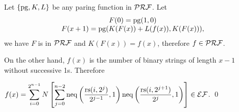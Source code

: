 \begin{pf} \rm
  Let $\{\mathrm{pg}, K, L\}$ be any paring function in $\mathcal{PRF}$. Let
\[
\begin{array}{c}
F(0) = \mathrm{pg}( 1, 0 ) \\
F(x + 1) = \mathrm{pg}(K(F(x)) + L(f(x)),  K(F(x))),
\end{array}
\]
we have $F$ is in $\mathcal{PRF}$ and $K(F(x)) = f(x)$, therefore $f\in\mathcal{PRF}$. 

On the other hand, 
$f(x)$ is the number of binary strings of length $x-1$ without successive 1s. Therefore

$\displaystyle f(x) = \sum_{i=0}^{ 2^{n-1}} N\left[ \sum_{j = 0}^{n - 2}
\mathrm{neq} \left( \frac{\mathrm{rs}(i, 2^j)}{2^{j - 1}} , 1  \right)
\mathrm{neq} \left( \frac{\mathrm{rs}(i, 2^{j+1})}{2^{j}} , 1  \right) \right]
\in\mathcal{EF}$.
\qed
\end{pf}


